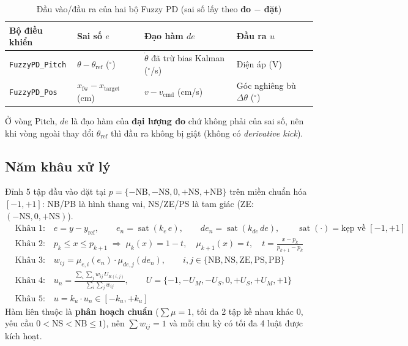 \documentclass[10pt,a4paper]{article}
\newcommand{\sat}{\operatorname{sat}}
\begin{document}
\begin{table}[htbp]
\centering
\caption{Đầu vào/đầu ra của hai bộ Fuzzy PD (sai số lấy theo \textbf{đo $-$ đặt})}
\footnotesize
\begin{tabular}{l l l l}
\toprule
\textbf{Bộ điều khiển} & \textbf{Sai số $e$} & \textbf{Đạo hàm $de$} & \textbf{Đầu ra $u$} \\
\midrule
\texttt{FuzzyPD\_Pitch} & $\theta - \theta_{\text{ref}}$ ($^\circ$) & $\dot{\theta}$ đã trừ bias Kalman ($^\circ$/s) & Điện áp (V) \\
\texttt{FuzzyPD\_Pos} & $x_{\text{fw}} - x_{\text{target}}$ (cm) & $v - v_{\text{cmd}}$ (cm/s) & Góc nghiêng bù $\Delta\theta$ ($^\circ$) \\
\bottomrule
\end{tabular}
\end{table}

Ở vòng Pitch, $de$ là đạo hàm của \textbf{đại lượng đo} chứ không phải của sai số, nên khi vòng ngoài thay đổi $\theta_{\text{ref}}$ thì đầu ra không bị giật (không có \textit{derivative kick}).

\subsection{Năm khâu xử lý}
Đỉnh 5 tập đầu vào đặt tại $p = \{-\text{NB}, -\text{NS}, 0, +\text{NS}, +\text{NB}\}$ trên miền chuẩn hóa $[-1, +1]$: NB/PB là hình thang vai, NS/ZE/PS là tam giác (ZE: $(-\text{NS}, 0, +\text{NS})$).
\begin{align}
&\text{Khâu 1:}\quad e = y - y_{\text{ref}}, \qquad e_n = \sat(k_e\, e), \qquad de_n = \sat(k_{de}\, de), \qquad \sat(\cdot) = \text{kẹp về } [-1, +1] \\
&\text{Khâu 2:}\quad p_k \le x \le p_{k+1} \;\Rightarrow\; \mu_k(x) = 1 - t, \quad \mu_{k+1}(x) = t, \quad t = \frac{x - p_k}{p_{k+1} - p_k} \\
&\text{Khâu 3:}\quad w_{ij} = \mu_{e,i}(e_n) \cdot \mu_{de,j}(de_n), \qquad i, j \in \{\text{NB}, \text{NS}, \text{ZE}, \text{PS}, \text{PB}\} \\
&\text{Khâu 4:}\quad u_n = \frac{\sum_i \sum_j w_{ij}\, U_{R(i,j)}}{\sum_i \sum_j w_{ij}}, \qquad U = \{-1, -U_M, -U_S, 0, +U_S, +U_M, +1\} \\
&\text{Khâu 5:}\quad u = k_u \cdot u_n \in [-k_u, +k_u]
\end{align}
Hàm liên thuộc là \textbf{phân hoạch chuẩn} ($\sum \mu = 1$, tối đa 2 tập kề nhau khác 0, yêu cầu $0 < \text{NS} < \text{NB} \le 1$), nên $\sum w_{ij} = 1$ và mỗi chu kỳ có tối đa 4 luật được kích hoạt.
\end{document}
